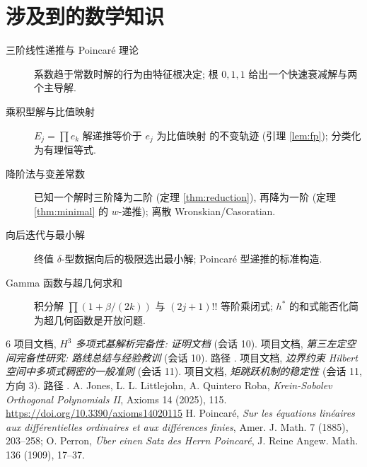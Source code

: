 \documentclass[UTF8]{ctexart}
\begin{document}
\section{涉及到的数学知识}

\begin{description}
	\item[三阶线性递推与 Poincar\'e 理论] 系数趋于常数时解的行为由特征根决定;
		根 $0, 1, 1$ 给出一个快速衰减解与两个主导解.
	\item[乘积型解与比值映射] $E_j = \prod e_k$ 解递推等价于 $e_j$ 为比值映射
		的不变轨迹 (引理 \ref{lem:fp}); 分类化为有理恒等式.
	\item[降阶法与变差常数] 已知一个解时三阶降为二阶 (定理 \ref{thm:reduction}),
		再降为一阶 (定理 \ref{thm:minimal} 的 $w$-递推); 离散 Wronskian/Casoratian.
	\item[向后迭代与最小解] 终值 $\delta$-型数据向后的极限选出最小解;
		Poincar\'e 型递推的标准构造.
	\item[Gamma 函数与超几何求和] 积分解 $\prod(1+\beta/(2k))$ 与
		$(2j+1)!!$ 等阶乘闭式; $h^*$ 的和式能否化简为超几何函数是开放问题.
\end{description}

\begin{thebibliography}{6}
 项目文档, \emph{$H^3$ 多项式基解析完备性: 证明文档} (会话 10).
 项目文档, \emph{第三左定空间完备性研究: 路线总结与经验教训} (会话 10).
	路径 .
 项目文档, \emph{边界约束 Hilbert 空间中多项式稠密的一般准则} (会话 11).
 项目文档, \emph{矩跳跃机制的稳定性} (会话 11, 方向 3).
	路径 .
 A. Jones, L. L. Littlejohn, A. Quintero Roba, \emph{Krein-Sobolev
	Orthogonal Polynomials II}, Axioms 14 (2025), 115.
	\url{https://doi.org/10.3390/axioms14020115}
 H. Poincar\'e, \emph{Sur les \'equations lin\'eaires aux
	diff\'erentielles ordinaires et aux diff\'erences finies}, Amer. J. Math.
	7 (1885), 203--258; O. Perron, \emph{\"Uber einen Satz des Herrn Poincar\'e},
	J. Reine Angew. Math. 136 (1909), 17--37.
\end{thebibliography}
\end{document}
